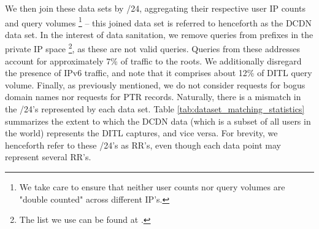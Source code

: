\documentclass[sigconf,nonacm,10pt]{acmart}
\begin{document}
\begin{table}[]
\centering
{}
\caption{Statistics displaying the extent to which the RR's of users in a large CDN represent RR's seen in the 2018 DITL captures. Also shown is the extent to which RR's of RIPE probes represent the 2018 DITL captures.}
\label{tab:dataset_matching_statistics}
\end{table}

We then join these data sets by /24, aggregating their respective user
IP counts and query volumes
\footnote{We take care to ensure that neither user counts nor query volumes are "double counted" across different IP's.}
-- this joined data set is referred to henceforth as the DCDN data set.
In the interest of data sanitation, we remove queries from prefixes in
the private IP space
\footnote{ The list we use can be found at \cite{private_ip_space}.}, as
these are not valid queries. Queries from these addresses account for
approximately 7\% of traffic to the roots. We additionally disregard the
presence of IPv6 traffic, and note that it comprises about 12\% of DITL
query volume. Finally, as previously mentioned, we do not consider
requests for bogus domain names nor requests for PTR records. Naturally,
there is a mismatch in the /24's represented by each data set. Table
\ref{tab:dataset_matching_statistics} summarizes the extent to which the
DCDN data (which is a subset of all users in the world) represents the
DITL captures, and vice versa. For brevity, we henceforth refer to these
/24's as RR's, even though each data point may represent several RR's.
\end{document}
